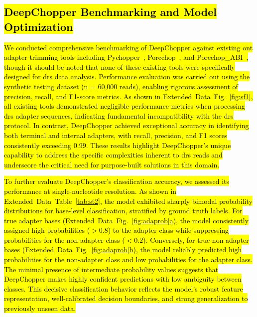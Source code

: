 \documentclass[pdflatex,sn-nature, lineno]{sn-jnl}%
\newcommand{\edfigref}[2]{Extended Data Fig.~\hyperref[#1]{\ref*{#1}#2}}
\newcommand{\edtableref}[2]{Extended Data Table~\hyperref[#1]{\ref*{#1}#2}}
\begin{document}
\subsection{\hl{DeepChopper Benchmarking and Model Optimization}}

\hl{We conducted comprehensive benchmarking of DeepChopper against existing \mbox{\gls{ont}} adapter trimming tools including Pychopper\mbox{~\cite{pychopper}}, Porechop\mbox{~\cite{Wick2017}}, and Porechop\_ABI\mbox{~\cite{bonenfant2023porechop}}, though it should be noted that none of these existing tools were specifically designed for \mbox{\gls{drs}} data analysis.
	Performance evaluation was carried out using the synthetic testing dataset (n = 60,000 reads), enabling rigorous assessment of precision, recall, and F1-score metrics.
	As shown in \mbox{\edfigref{fig:sf1}{}}, all existing tools demonstrated negligible performance metrics when processing \mbox{\gls{drs}} adapter sequences, indicating fundamental incompatibility with the \mbox{\gls{drs}} protocol.
	In contrast, DeepChopper achieved exceptional accuracy in identifying both terminal and internal adapters, with recall, precision, and F1 scores consistently exceeding 0.99.
	These results highlight DeepChopper's unique capability to address the specific complexities inherent to \mbox{\gls{drs}} reads and underscore the critical need for purpose-built solutions in this domain.}

\hl{To further evaluate DeepChopper’s classification accuracy, we assessed its performance at single-nucleotide resolution. As shown in \mbox{\edtableref{tab:st2}{}}, the model exhibited sharply bimodal probability distributions for base-level classification, stratified by ground truth labels. For true adapter bases (\mbox{\edfigref{fig:adaprob}{a}}), the model consistently assigned high probabilities ($>0.8$) to the adapter class while suppressing probabilities for the non-adapter class ($<0.2$).
	Conversely, for true non-adapter bases (\mbox{\edfigref{fig:adaprob}{b}}), the model reliably predicted high probabilities for the non-adapter class and low probabilities for the adapter class.
	The minimal presence of intermediate probability values suggests that DeepChopper makes highly confident predictions with low ambiguity between classes.
	This decisive classification behavior reflects the model’s robust feature representation, well-calibrated decision boundaries, and strong generalization to previously unseen data.}
\end{document}
